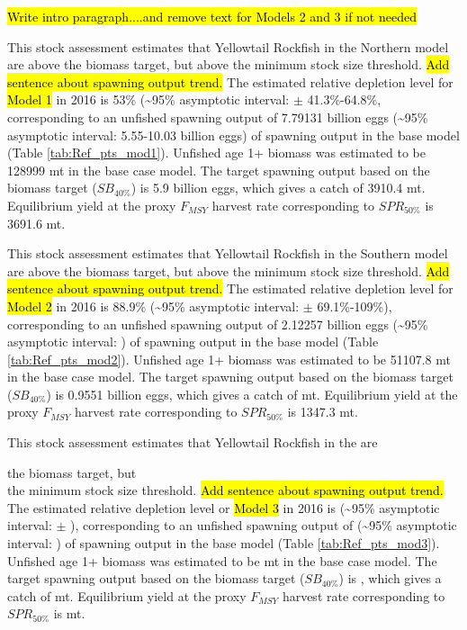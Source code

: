 \documentclass[12pt,]{article}
\begin{document}
\hl{Write intro paragraph....and remove text for Models 2 and 3 if not needed}

This stock assessment estimates that Yellowtail Rockfish in the Northern
model are above the biomass target, but above the minimum stock size
threshold. \hl{Add sentence about spawning output trend.} The estimated
relative depletion level for \hl{Model 1} in 2016 is 53\%
(\textasciitilde{}95\% asymptotic interval: \(\pm\) 41.3\%-64.8\%,
corresponding to an unfished spawning output of 7.79131 billion eggs
(\textasciitilde{}95\% asymptotic interval: 5.55-10.03 billion eggs) of
spawning output in the base model (Table \ref{tab:Ref_pts_mod1}).
Unfished age 1+ biomass was estimated to be 128999 mt in the base case
model. The target spawning output based on the biomass target
(\(SB_{40\%}\)) is 5.9 billion eggs, which gives a catch of 3910.4 mt.
Equilibrium yield at the proxy \(F_{MSY}\) harvest rate corresponding to
\(SPR_{50\%}\) is 3691.6 mt.

This stock assessment estimates that Yellowtail Rockfish in the Southern
model are above the biomass target, but above the minimum stock size
threshold. \hl{Add sentence about spawning output trend.} The estimated
relative depletion level for \hl{Model 2} in 2016 is 88.9\%
(\textasciitilde{}95\% asymptotic interval: \(\pm\) 69.1\%-109\%),
corresponding to an unfished spawning output of 2.12257 billion eggs
(\textasciitilde{}95\% asymptotic interval: ) of spawning output in the
base model (Table \ref{tab:Ref_pts_mod2}). Unfished age 1+ biomass was
estimated to be 51107.8 mt in the base case model. The target spawning
output based on the biomass target (\(SB_{40\%}\)) is 0.9551 billion
eggs, which gives a catch of mt. Equilibrium yield at the proxy
\(F_{MSY}\) harvest rate corresponding to \(SPR_{50\%}\) is 1347.3 mt.

This stock assessment estimates that Yellowtail Rockfish in the are

the biomass target, but\\
the minimum stock size threshold.
\hl{Add sentence about spawning output trend.} The estimated relative
depletion level or \hl{Model 3} in 2016 is (\textasciitilde{}95\%
asymptotic interval: \(\pm\) ), corresponding to an unfished spawning
output of (\textasciitilde{}95\% asymptotic interval: ) of spawning
output in the base model (Table \ref{tab:Ref_pts_mod3}). Unfished age 1+
biomass was estimated to be mt in the base case model. The target
spawning output based on the biomass target (\(SB_{40\%}\)) is , which
gives a catch of mt. Equilibrium yield at the proxy \(F_{MSY}\) harvest
rate corresponding to \(SPR_{50\%}\) is mt.
\end{document}
